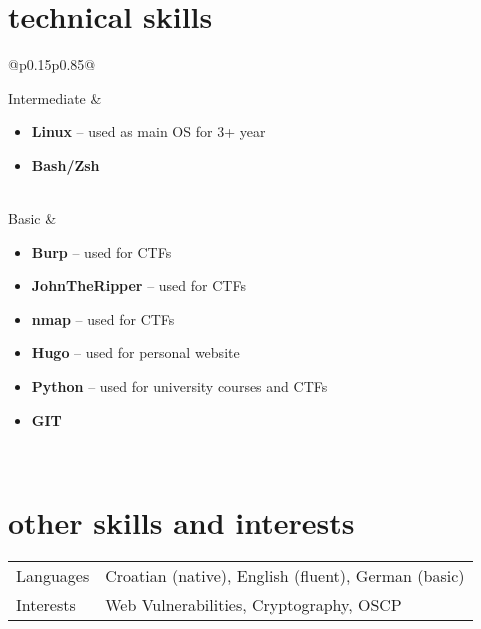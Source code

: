 \documentclass[a4paper]{article}
\makeatletter
\newlength{\tablewidth}
\newenvironment{skills}{%
\setlength{\tablewidth}{\linewidth}
\addtolength{\tablewidth}{-2\tabcolsep}
\begin{tabular}{@{}p{0.15\tablewidth}p{0.85\tablewidth}@{}}
}{%
\end{tabular}
}
\makeatother
\begin{document}
\section{technical skills}
\begin{skills}
    Intermediate &
    \begin{itemize}
        
        \item \textbf{Linux} -- used as main OS for 3+ year
        \item \textbf{Bash/Zsh}

    \end{itemize} \\
    Basic &
    \begin{itemize}
        \item \textbf{Burp} -- used for CTFs
        \item \textbf{JohnTheRipper} -- used for CTFs
        \item \textbf{nmap} -- used for CTFs
		\item \textbf{Hugo} -- used for personal website
        \item \textbf{Python} -- used for university courses and CTFs
        \item \textbf{GIT} 

    \end{itemize} \\
\end{skills}

\section{other skills and interests}
\begin{skills}
    Languages & Croatian (native), English (fluent), German (basic) \\
    Interests & Web Vulnerabilities, Cryptography, OSCP \\
\end{skills}
\end{document}
